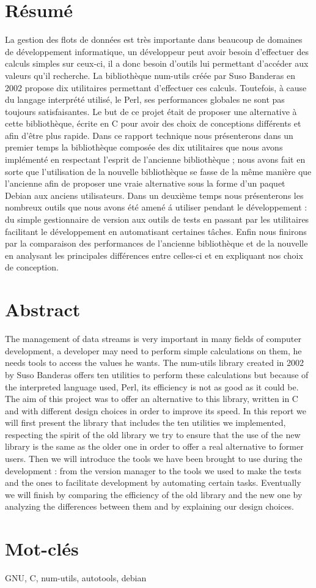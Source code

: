 \section*{R\'esum\'e}

La gestion des flots de donn\'ees est tr\`es importante dans beaucoup de domaines de d\'eveloppement informatique, un d\'eveloppeur peut avoir besoin 
d'effectuer des calculs simples sur ceux-ci, il a donc besoin d'outils lui permettant d'acc\'eder aux valeurs qu'il recherche. La biblioth\`eque num-utils
 cr\'e\'ee par Suso Banderas en 2002 propose dix utilitaires permettant d'effectuer ces calculs. Toutefois, \`a cause du langage interpr\'et\'e utilis\'e, 
le Perl, ses performances globales ne sont pas toujours satisfaisantes. Le but de ce projet \'etait de proposer une alternative \`a cette biblioth\`eque, 
\'ecrite en C pour avoir des choix de conceptions diff\'erents et afin d'\^etre plus rapide. Dans ce rapport technique nous pr\'esenterons dans un premier temps 
la biblioth\`eque compos\'ee des dix utilitaires que nous avons impl\'ement\'e en respectant l'esprit de l'ancienne biblioth\`eque ; nous avons fait en sorte que
 l'utilisation de la nouvelle biblioth\`eque se fasse de la m\^eme mani\`ere que l'ancienne afin de proposer une vraie alternative sous la forme d'un paquet
 Debian aux anciens utilisateurs. Dans un deuxi\`eme temps nous pr\'esenterons les nombreux outils que nous avons \'et\'e amen\'e \'a utiliser pendant le 
d\'eveloppement : du simple gestionnaire de version aux outils de tests en passant par les utilitaires facilitant le d\'eveloppement en automatisant certaines t\^aches.
 Enfin nous finirons par la comparaison des performances de l'ancienne biblioth\`eque et de la nouvelle en analysant les principales diff\'erences entre celles-ci et en expliquant nos choix de conception.

\section*{Abstract}

The management of data streams is very important in many fields of computer development, a developer may need to perform simple calculations on them, he needs tools
 to access the values he wants. The num-utils library created in 2002 by Suso Banderas offers ten utilities to perform these calculations but because of the
 interpreted language used, Perl, its efficiency is not as good as it could be. The aim of this project was to offer an alternative to this library, written in
 C and with different design choices in order to improve its speed. In this report we will first present  the library that includes the ten utilities we implemented,
 respecting the spirit of the old library we try to ensure that the use of the new library is the same as the older one in order to offer a real alternative to former
 users. Then we will introduce the tools we have been brought to use during the development : from the version manager to the tools we used to make the tests and the
 ones to facilitate development by automating certain tasks. Eventually we will finish by comparing the efficiency of the old library and the new one by analyzing the
 differences between them and by explaining our design choices.

\section*{Mot-cl\'es}

GNU, C, num-utils, autotools, debian
